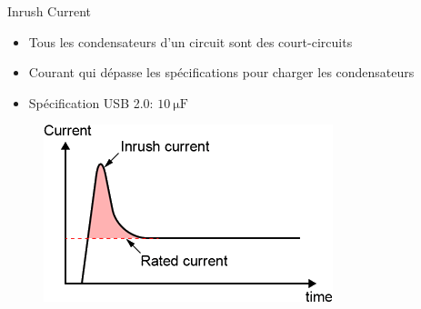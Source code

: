 \begin{frame}{Inrush Current}
    \begin{itemize}
        \item Tous les condensateurs d'un circuit sont des court-circuits
        \item Courant qui dépasse les spécifications pour charger les condensateurs
        \bigskip
        \item<2-> Spécification USB 2.0: $\SI{10}{\micro\farad}$
    \end{itemize}

    \vfill
    \begin{figure}
        \centering
        \includegraphics[height=0.55\textheight]{pictures/inrush-current.png}
    \end{figure}
\end{frame}

